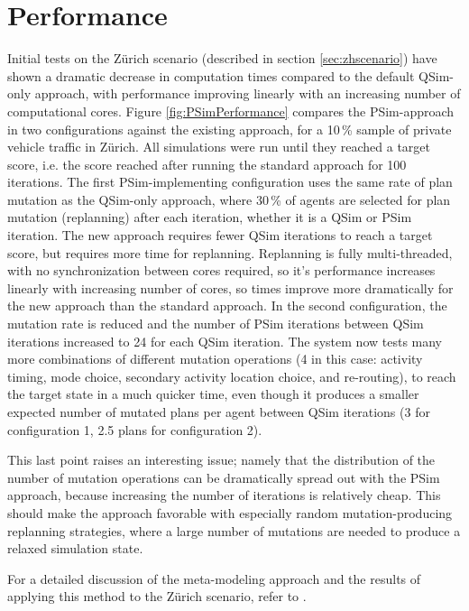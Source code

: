 \section{Performance}
Initial tests on the Zürich scenario (described in section \ref{sec:zhscenario}) have shown a dramatic decrease in computation times compared to the default QSim-only approach, with performance improving linearly with an increasing number of computational cores.
Figure \ref{fig:PSimPerformance} compares the PSim-approach in two configurations against the existing approach, for a 10\,\% sample of private vehicle traffic in Zürich. All simulations were run until they reached a target score, i.e. the score reached after running the standard approach for 100 iterations. The first PSim-implementing configuration uses the same rate of plan mutation as the QSim-only approach, where 30\,\% of agents are selected for plan mutation (replanning) after each iteration, whether it is a QSim or PSim iteration. The new approach requires fewer QSim iterations to reach a target score, but requires more time for replanning. Replanning is fully multi-threaded, with no synchronization between cores required, so it’s performance increases linearly with increasing number of cores, so times improve more dramatically for the new approach than the standard approach.
In the second configuration, the mutation rate is reduced and the number of PSim iterations between QSim iterations increased to 24 for each QSim iteration. The system now tests many more combinations of different mutation operations (4 in this case: activity timing, mode choice, secondary activity location choice, and re-routing), to reach the target state in a much quicker time, even though it produces a smaller expected number of mutated plans per agent between QSim iterations (3 for configuration 1, 2.5 plans for configuration 2).

This last point raises an interesting issue; namely that the distribution of the number of mutation operations can be dramatically spread out with the PSim approach, because increasing the number of iterations is relatively cheap. This should make the approach favorable with especially random mutation-producing replanning strategies, where a large number of mutations are needed to produce a relaxed simulation state.

For a detailed discussion of the meta-modeling approach and the results of applying this method to the Zürich scenario, refer to \citet[][]{FourieEtAl_TRR_2013}.

